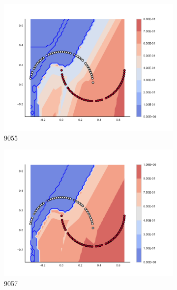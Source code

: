 \begin{figure}[h]
\begin{subfigure}[b]{0.09\textwidth}
    \includegraphics[clip, trim=2.35cm 1.75cm 4.5cm 0cm,width=\textwidth]{img/convergence/9055.pdf}
    \caption{9055}
    \label{fig:convergence_9055}
\end{subfigure}
%
\begin{subfigure}[b]{0.09\textwidth}
    \includegraphics[clip, trim=2.35cm 1.75cm 4.5cm 0cm,width=\textwidth]{img/convergence/9057.pdf}
    \caption{9057}
    \label{fig:convergence_9057}
\end{subfigure}
%
\begin{subfigure}[b]{0.09\textwidth}

\end{subfigure}
\end{figure}
